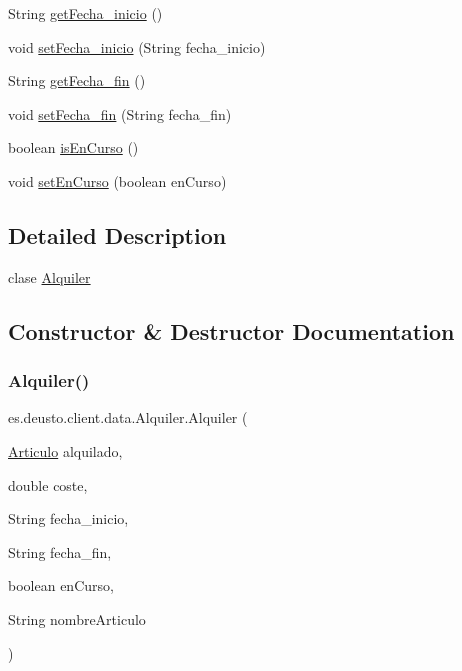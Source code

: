 \begin{DoxyCompactItemize}
\item 
String \mbox{\hyperlink{classes_1_1deusto_1_1client_1_1data_1_1_alquiler_ae589eb408109f74f9ee1900801c508db}{get\+Fecha\+\_\+inicio}} ()
\item 
void \mbox{\hyperlink{classes_1_1deusto_1_1client_1_1data_1_1_alquiler_a2821cd543f5cb7cf7ba720103b16a21a}{set\+Fecha\+\_\+inicio}} (String fecha\+\_\+inicio)
\item 
String \mbox{\hyperlink{classes_1_1deusto_1_1client_1_1data_1_1_alquiler_ad625d7c18ec14b722c8c0651a5d11cbc}{get\+Fecha\+\_\+fin}} ()
\item 
void \mbox{\hyperlink{classes_1_1deusto_1_1client_1_1data_1_1_alquiler_a5d6ba9ac126d41d43ab08f02d25c5c07}{set\+Fecha\+\_\+fin}} (String fecha\+\_\+fin)
\item 
boolean \mbox{\hyperlink{classes_1_1deusto_1_1client_1_1data_1_1_alquiler_a2434d8d455e7606807226168efe55c35}{is\+En\+Curso}} ()
\item 
void \mbox{\hyperlink{classes_1_1deusto_1_1client_1_1data_1_1_alquiler_a1910a30f5dcf4fbecd4766704f8bd116}{set\+En\+Curso}} (boolean en\+Curso)
\end{DoxyCompactItemize}


\subsection{Detailed Description}
clase \mbox{\hyperlink{classes_1_1deusto_1_1client_1_1data_1_1_alquiler}{Alquiler}} 

\subsection{Constructor \& Destructor Documentation}
\mbox{\label{classes_1_1deusto_1_1client_1_1data_1_1_alquiler_a87196507e38a95dcd4e7e4046e75ae5c}} 
\subsubsection{\texorpdfstring{Alquiler()}{Alquiler()}}
{\footnotesize\ttfamily es.\+deusto.\+client.\+data.\+Alquiler.\+Alquiler (\begin{DoxyParamCaption}\item[{\mbox{\hyperlink{classes_1_1deusto_1_1client_1_1data_1_1_articulo}{Articulo}}}]{alquilado,  }\item[{double}]{coste,  }\item[{String}]{fecha\+\_\+inicio,  }\item[{String}]{fecha\+\_\+fin,  }\item[{boolean}]{en\+Curso,  }\item[{String}]{nombre\+Articulo }\end{DoxyParamCaption})}

